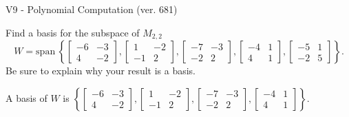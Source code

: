 \begin{exercise}
  \begin{exerciseTitle}V9 - Polynomial Computation (ver. 681)\end{exerciseTitle}
  \begin{exerciseStatement}
    Find a basis for the subspace of \(M_{2,2}\) 
\[W=\mathrm{span}\ \left\{\left[\begin{array}{cc}
-6 & -3 \\
4 & -2
\end{array}\right] , \left[\begin{array}{cc}
1 & -2 \\
-1 & 2
\end{array}\right] , \left[\begin{array}{cc}
-7 & -3 \\
-2 & 2
\end{array}\right] , \left[\begin{array}{cc}
-4 & 1 \\
4 & 1
\end{array}\right] , \left[\begin{array}{cc}
-5 & 1 \\
-2 & 5
\end{array}\right]\right\}.\]
 Be sure to explain why your result is a basis.


  \end{exerciseStatement}
  \begin{exerciseAnswer}
   A basis of \(W\) is  \(\left\{\left[\begin{array}{cc}
-6 & -3 \\
4 & -2
\end{array}\right] , \left[\begin{array}{cc}
1 & -2 \\
-1 & 2
\end{array}\right] , \left[\begin{array}{cc}
-7 & -3 \\
-2 & 2
\end{array}\right] , \left[\begin{array}{cc}
-4 & 1 \\
4 & 1
\end{array}\right]\right\}\).
  


  \end{exerciseAnswer}
\end{exercise}